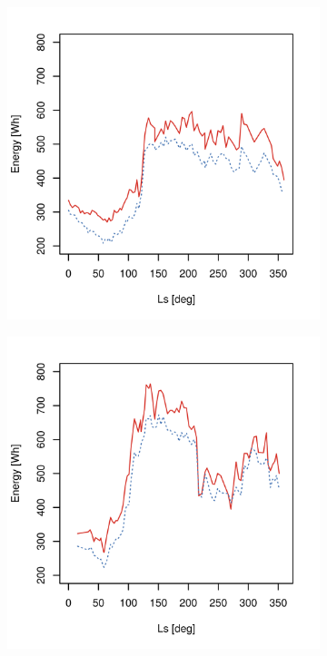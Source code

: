 \begin{figure}[h]
\begin{subfigure}[t]{\subfigureWidth}
		\includegraphics[height=\graphicsHeight]{sections/appendix/energy-error-margin/plots/predicted-vs-measured-energy-my30-adjusted.png}
		\label{fig:plot:sub:mer-energy-production-predicted-vs-reported-my30-adjusted}
	\end{subfigure}\hfill
    \begin{subfigure}[t]{\subfigureWidth}
        \centering
		\includegraphics[height=\graphicsHeight]{sections/appendix/energy-error-margin/plots/predicted-vs-measured-energy-my32-adjusted.png}

\end{subfigure}
\end{figure}
